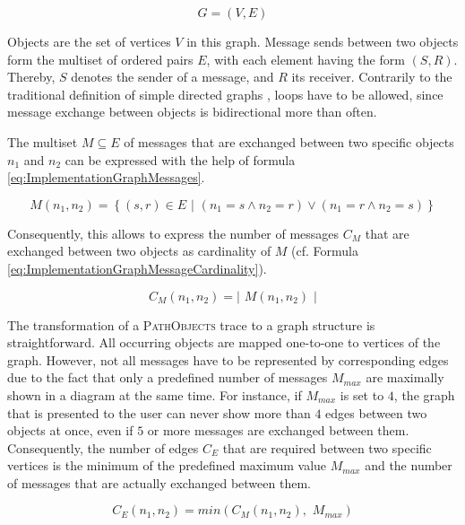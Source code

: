 \begin{equation}
G = (V, E)
\label{eq:ImplementationGraph}
\end{equation}

Objects are the set of vertices $V$ in this graph.
Message sends between two objects form the multiset of ordered pairs $E$, with each element having the form $(S,R)$.
Thereby, $S$ denotes the sender of a message, and $R$ its receiver.
Contrarily to the traditional definition of simple directed graphs \cite{berge_graphs_1985}, loops have to be allowed, since message exchange between objects is bidirectional more than often.

The multiset $M \subseteq E$ of messages that are exchanged between two specific objects $n_1$ and $n_2$ can be expressed with the help of formula \ref{eq:ImplementationGraphMessages}.

\begin{equation}
M(n_1, n_2) = \left\{ (s,r) \in E \phantom{i}| \phantom{i} (n_1 = s \land n_2 = r) \lor (n_1 = r \land n_2 = s) \right\}
\label{eq:ImplementationGraphMessages}
\end{equation}

Consequently, this allows to express the number of messages $C_M$ that are exchanged between two objects as cardinality of $M$ (cf. Formula \ref{eq:ImplementationGraphMessageCardinality}).

\begin{equation}
C_M(n_1, n_2) = \left\vert \phantom{i} M(n_1, n_2) \phantom{i} \right\vert
\label{eq:ImplementationGraphMessageCardinality}
\end{equation}

The transformation of a \textsc{PathObjects} trace to a graph structure is straightforward.
All occurring objects are mapped one-to-one to vertices of the graph.
However, not all messages have to be represented by corresponding edges due to the fact that only a predefined number of messages $M_{max}$ are maximally shown in a diagram at the same time.
For instance, if $M_{max}$ is set to $4$, the graph that is presented to the user can never show more than $4$ edges between two objects at once, even if $5$ or more messages are exchanged between them.
Consequently, the number of edges $C_E$ that are required between two specific vertices is the minimum of the predefined maximum value $M_{max}$ and the number of messages that are actually exchanged between them.

\begin{equation}
C_E(n_1, n_2) = min(C_M(n_1, n_2),\phantom{i} M_{max})
\end{equation}

